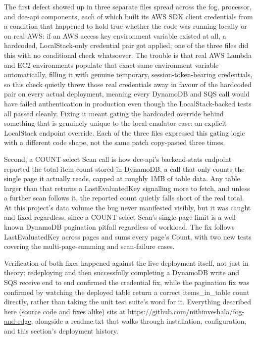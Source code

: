 \documentclass[conference]{IEEEtran}
\begin{document}
The first defect showed up in three separate files spread across the fog, processor, and dce-api components, each of which built its AWS SDK client credentials from a condition that happened to hold true whether the code was running locally or on real AWS: if an AWS access key environment variable existed at all, a hardcoded, LocalStack-only credential pair got applied; one of the three files did this with no conditional check whatsoever. The trouble is that real AWS Lambda and EC2 environments populate that exact same environment variable automatically, filling it with genuine temporary, session-token-bearing credentials, so this check quietly threw those real credentials away in favour of the hardcoded pair on every actual deployment, meaning every DynamoDB and SQS call would have failed authentication in production even though the LocalStack-backed tests all passed cleanly. Fixing it meant gating the hardcoded override behind something that is genuinely unique to the local-emulator case: an explicit LocalStack endpoint override. Each of the three files expressed this gating logic with a different code shape, not the same patch copy-pasted three times.

Second, a COUNT-select Scan call is how dce-api's backend-stats endpoint reported the total item count stored in DynamoDB, a call that only counts the single page it actually reads, capped at roughly 1MB of table data. Any table larger than that returns a LastEvaluatedKey signalling more to fetch, and unless a further scan follows it, the reported count quietly falls short of the real total. At this project's data volume the bug never manifested visibly, but it was caught and fixed regardless, since a COUNT-select Scan's single-page limit is a well-known DynamoDB pagination pitfall regardless of workload. The fix follows LastEvaluatedKey across pages and sums every page's Count, with two new tests covering the multi-page-summing and scan-failure cases.

Verification of both fixes happened against the live deployment itself, not just in theory: redeploying and then successfully completing a DynamoDB write and SQS receive end to end confirmed the credential fix, while the pagination fix was confirmed by watching the deployed table return a correct items\_in\_table count directly, rather than taking the unit test suite's word for it. Everything described here (source code and fixes alike) sits at \url{https://github.com/nithinveshala/fog-and-edge}, alongside a readme.txt that walks through installation, configuration, and this section's deployment history.
\end{document}

